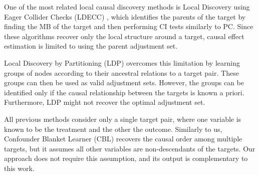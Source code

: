 One of the most related local causal discovery methods is Local Discovery using Eager Collider Checks (LDECC) \citep{gupta2023local}, which identifies the parents of the target by finding the MB of the target and then performing \ac{CI} tests similarly to PC.
Since these algorithms recover only the local structure around a target, causal effect estimation is limited to using the parent adjustment set.

Local Discovery by Partitioning (LDP) \citep{maasch2024local} overcomes this limitation by learning groups of nodes according to their ancestral relations to a target pair.
These groups can then be used as valid adjustment sets.
However, the groups can be identified only if the causal relationship between the targets is known a priori.
Furthermore, LDP might not recover the optimal adjustment set.

All previous methods consider only a single target pair, where one variable is known to be the treatment and the other the outcome.
Similarly to us, Confounder Blanket Learner (CBL) \citep{watson2022causal} recovers the causal order among multiple targets, but it assumes all other variables are non-descendants of the targets. Our approach does not require this assumption, and its output is complementary to this work.
